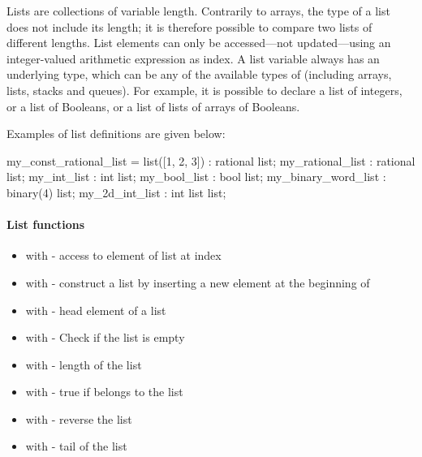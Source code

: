 Lists are collections of variable length.
Contrarily to arrays, the type of a list does not include its length; it is therefore possible to compare two lists of different lengths.
List elements can only be accessed---not updated---using an integer-valued arithmetic expression as index.
A list variable always has an underlying type, which can be any of the available types of \imitator{} (including arrays, lists, stacks and queues).
For example, it is possible to declare a list of integers, or a list of Booleans, or a list of lists of arrays of Booleans.

Examples of list definitions are given below:

\begin{IMITATORmodel}
	my_const_rational_list = list([1, 2, 3]) : rational list;
	my_rational_list 			: rational list;
	my_int_list						: int list;
	my_bool_list        	: bool list;
	my_binary_word_list 	: binary(4) list;
	my_2d_int_list      	: int list list;
\end{IMITATORmodel}


\paragraph{List functions}

\begin{itemize}
	\item {} with  - access to element of list  at index 
	\item \label{item:lbl-list_cons}  with  - construct a list by inserting a new element  at the beginning of 
	\item \label{item:lbl-list_hd}  with  - head element of a list 
	\item \label{item:lbl-list_is_empty}  with  - Check if the list  is empty
	\item \label{item:lbl-list_length}  with  - length of the list 
	\item \label{item:lbl-list_mem}  with  - true if  belongs to the list~
	\item \label{item:lbl-list_rev}  with  - reverse the list~
	\item \label{item:lbl-list_tl}  with  - tail of the list 
\end{itemize}

